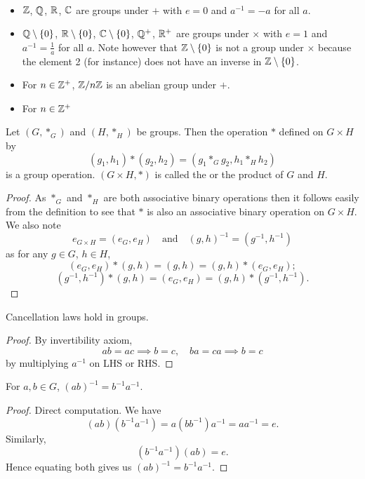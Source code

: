 \begin{example} \
\begin{itemize}
\item $\mathbb Z$, $\mathbb Q$, $\mathbb R$, $\mathbb C$ are groups under $+$ with $e=0$ and $a^{-1}=-a$ for all $a$.
\item $\mathbb Q\setminus\{0\}$, $\mathbb R\setminus\{0\}$, $\mathbb C\setminus\{0\}$, $\mathbb Q^+$, $\mathbb R^+$ are groups under $\times$ with $e=1$ and $a^{-1}=\frac{1}{a}$ for all $a$. Note however that $\mathbb Z\setminus\{0\}$ is not a group under $\times$ because the element 2 (for instance) does not have an inverse in $\mathbb Z\setminus\{0\}$.
\item For $n\in\mathbb Z^+$, $\mathbb Z/n\mathbb Z$ is an abelian group under $+$.
\item For $n\in\mathbb Z^+$
\end{itemize}
\end{example}

\begin{definition}
Let $(G,\ast_G)$ and $(H,\ast_H)$ be groups. Then the operation $\ast$ defined on $G\times H$ by
\[ (g_1,h_1)\ast(g_2,h_2)=(g_1\ast_G g_2,h_1\ast_H h_2) \]
is a group operation. $(G \times H, \ast)$ is called the  or the product of $G$ and $H$.
\end{definition}
    
\begin{proof}
As $\ast_G$ and $\ast_H$ are both associative binary operations then it follows easily from the definition to see that $\ast$ is also an associative binary operation on $G \times H$. We also note
\[ e_{G\times H}=(e_G,e_H) \quad \text{and} \quad (g,h)^{-1}=(g^{-1},h^{-1}) \]
as for any $g \in G$, $h \in H$,
\[ (e_G,e_H)\ast(g,h)=(g,h)=(g,h)\ast(e_G,e_H); \]
\[ (g^{-1},h^{-1})\ast(g,h)=(e_G,e_H)=(g,h)\ast(g^{-1},h^{-1}). \]
\end{proof}

\begin{proposition}
Cancellation laws hold in groups.
\end{proposition}
\begin{proof}
By invertibility axiom,
\[ ab=ac \implies b=c,\quad ba=ca\implies b=c \]
by multiplying $a^{-1}$ on LHS or RHS. 
\end{proof}

\begin{proposition}
For $a,b \in G$, $(ab)^{-1} = b^{-1}a^{-1}$.
\end{proposition}
\begin{proof}
Direct computation. We have
\[ (ab)(b^{-1}a^{-1}) = a(bb^{-1})a^{-1} = aa^{-1} = e. \]
Similarly, 
\[ (b^{-1}a^{-1})(ab) = e. \]
Hence equating both gives us $(ab)^{-1} = b^{-1}a^{-1}$.
\end{proof}

